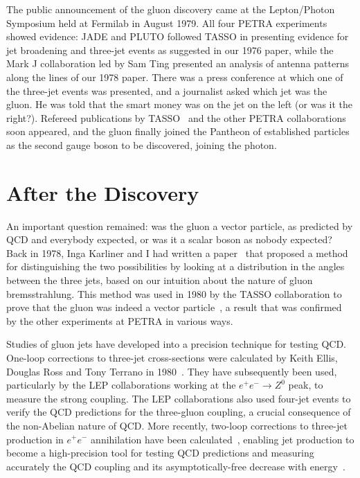 \documentclass[12pt]{article} %
\begin{document}
The public announcement of the gluon discovery came at the Lepton/Photon Symposium held at Fermilab in August 1979.
All four PETRA experiments showed evidence: JADE and PLUTO followed TASSO in presenting evidence for jet 
broadening and three-jet events as suggested in our 1976 paper, while the Mark J collaboration led by Sam Ting
presented an analysis of antenna patterns along the lines of our 1978 paper.
There was a press conference at which one of the three-jet events was presented,
and a journalist asked which jet was the gluon. He was told that the smart money was on the jet on the left (or was it the right?). Refereed publications by TASSO~\cite{TASSO} and the other PETRA collaborations~\cite{PETRA} soon appeared,
and the gluon finally joined the Pantheon of established particles as the second gauge boson to be discovered,
joining the photon.

\section{After the Discovery}

An important question remained: was the gluon a vector particle, as predicted by QCD and everybody expected,
or was it a scalar boson as nobody expected? Back in 1978, Inga Karliner and I had written
a paper~\cite{EK} that proposed a method for distinguishing the two possibilities by looking at a distribution
in the angles between the three jets, based on our intuition about the nature of gluon bremsstrahlung.
This method was used in 1980 by the TASSO collaboration to prove that the gluon was indeed a vector particle~\cite{spin},
a result that was confirmed by the other experiments at PETRA in various ways.

Studies of gluon jets have developed into a precision technique for testing QCD.
One-loop corrections to three-jet cross-sections were calculated by Keith Ellis, Douglas Ross and Tony Terrano in 1980~\cite{ERT}.
They have subsequently been used, particularly by the LEP collaborations working at the $e^+ e^- \to Z^0$ peak,
to measure the strong coupling. The LEP collaborations also used four-jet events to verify the QCD predictions
for the three-gluon coupling, a crucial consequence of the non-Abelian nature of QCD.
More recently, two-loop corrections to three-jet production in $e^+ e^-$ annihilation
have been calculated~\cite{Glover}, enabling jet production to become a high-precision tool for
testing QCD predictions and measuring accurately the QCD coupling and its
asymptotically-free decrease with energy~\cite{PDG}.
\end{document}
